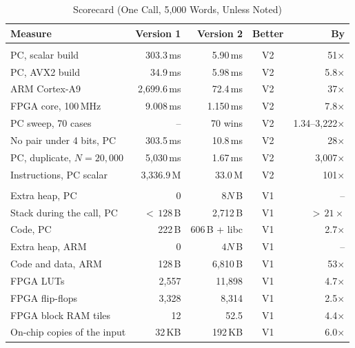 \documentclass[conference,a4paper]{IEEEtran}
\begin{document}
\begin{table}[!t]
\caption{Scorecard (One Call, 5,000 Words, Unless Noted)}
\label{tab:score}
\centering\footnotesize
\setlength{\tabcolsep}{2.5pt}
\begin{tabularx}{\columnwidth}{@{}>{\raggedright\arraybackslash}Xrrcr@{}}
\toprule
\textbf{Measure} & \textbf{Version 1} & \textbf{Version 2} & \textbf{Better} & \textbf{By} \\
\midrule
\multicolumn{5}{@{}l}{\emph{Processing time}} \\
PC, scalar build             & 303.3\,ms   & 5.90\,ms  & V2 & 51$\times$ \\
PC, AVX2 build               & 34.9\,ms    & 5.98\,ms  & V2 & 5.8$\times$ \\
ARM Cortex-A9                & 2,699.6\,ms & 72.4\,ms  & V2 & 37$\times$ \\
FPGA core, 100\,MHz          & 9.008\,ms   & 1.150\,ms & V2 & 7.8$\times$ \\
PC sweep, 70 cases           & --          & 70 wins   & V2 & 1.34--3,222$\times$ \\
No pair under 4 bits, PC     & 303.5\,ms   & 10.8\,ms  & V2 & 28$\times$ \\
PC, duplicate, $N=20{,}000$  & 5,030\,ms   & 1.67\,ms  & V2 & 3,007$\times$ \\
Instructions, PC scalar      & 3,336.9\,M  & 33.0\,M   & V2 & 101$\times$ \\
\addlinespace[3pt]
\multicolumn{5}{@{}l}{\emph{Memory size}} \\
Extra heap, PC               & 0           & $8N$\,B   & V1 & -- \\
Stack during the call, PC    & ${<}\,128$\,B & 2,712\,B & V1 & ${>}\,21\times$ \\
Code, PC                     & 222\,B      & 606\,B + libc & V1 & 2.7$\times$ \\
Extra heap, ARM              & 0           & $4N$\,B   & V1 & -- \\
Code and data, ARM           & 128\,B      & 6,810\,B  & V1 & 53$\times$ \\
FPGA LUTs                    & 2,557       & 11,898    & V1 & 4.7$\times$ \\
FPGA flip-flops              & 3,328       & 8,314     & V1 & 2.5$\times$ \\
FPGA block RAM tiles         & 12          & 52.5      & V1 & 4.4$\times$ \\
On-chip copies of the input  & 32\,KB      & 192\,KB   & V1 & 6.0$\times$ \\

\end{tabularx}
\end{table}
\end{document}
